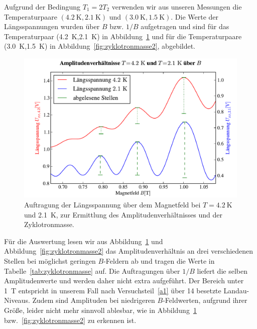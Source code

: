 \documentclass[paper=a4,fontsize=10pt,DIV=18,twocolumn,parskip=half]{scrartcl}
\numberwithin{equation}{section}    %
\newcommand{\kor}[1]{{\color{darkgreen}#1}}
\begin{document}
Aufgrund der Bedingung $T_{1}=2T_{2}$ verwenden wir aus unseren Messungen die Temperaturpaare $(\SI{4.2}{\kelvin},\SI{2.1}{\kelvin})$ und $(\SI{3.0}{\kelvin},\SI{1.5}{\kelvin})$. \kor{Die Werte der Längsspannungen wurden über $B$ bzw. $1/B$ aufgetragen und sind für das Temperaturpaar (\SI{4.2}{\kelvin},\SI{2.1}{\kelvin}) in Abbildung~\ref{fig:zyklotronmasse} und für die Temperaturpaare (\SI{3.0}{\kelvin},\SI{1.5}{\kelvin}) in Abbildung~\ref{fig:zyklotronmasse2}, abgebildet.}
\begin{figure}[htp]
	\begin{center}
		\includegraphics[width=\columnwidth]{Data-Plots/11-4,2-2,1-zyklotron-B.pdf}
		\caption{Auftragung der Längsspannung über dem Magnetfeld bei $T=\SI{4.2}{\kelvin}$ und \SI{2.1}{\kelvin}, zur Ermittlung des Amplitudenverhältnisses und der Zyklotronmasse.}
		\label{fig:zyklotronmasse}
	\end{center}
\end{figure}
\kor{
Für die Auswertung lesen wir aus Abbildung~\ref{fig:zyklotronmasse} und Abbildung~\ref{fig:zyklotronmasse2} das Amplitudenverhältnis an drei verschiedenen Stellen bei möglichst geringen $B$-Feldern ab und tragen die Werte in Tabelle~\ref{tab:zyklotronmasse} auf. Die Auftragungen über $1/B$ liefert die selben Amplitudenwerte und werden daher nicht extra aufgeführt. Der Bereich unter \SI{1}{\tesla} entspricht in unserem Fall nach Versuchsteil~\ref{a1} über 14 besetzte Landau-Niveaus. Zudem sind Amplituden bei niedrigeren $B$-Feldwerten, aufgrund ihrer Größe, leider nicht mehr sinnvoll ablesbar, wie in Abbildung~\ref{fig:zyklotronmasse} bzw.~\ref{fig:zyklotronmasse2} zu erkennen ist.
}
\end{document}
